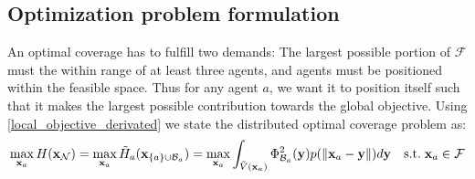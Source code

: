 \subsection{Optimization problem formulation}
An optimal coverage has to fulfill two demands: The largest possible portion of $\mathcal{F}$ must the within range of at least three agents, and agents must be positioned within the feasible space. Thus for any agent $a$,
we want it to position itself such that it makes the largest possible contribution towards the global objective. Using \eqref{local_objective_derivated} we state the distributed optimal coverage problem as:
\begin{equation}
  \max_{\mathbf{x}_{a}} H(\mathbf{x}_{\mathcal{N}}) = \max_{\mathbf{x}_{a}} \tilde{H}_{a}(\mathbf{x}_{\{a\}\cup\mathcal{B}_{a}}) = \max_{\mathbf{x}_{a}} \int_{\tilde{V}(\mathbf{x}_{a})}\Phi^{2}_{\mathcal{B}_{a}}(\mathbf{y})p(\left\lVert\mathbf{x}_{a}-\mathbf{y}\right\rVert)d\mathbf{y}\quad\mathrm{s.t.}\;\mathbf{x}_{a}\in\mathcal{F}
\end{equation}